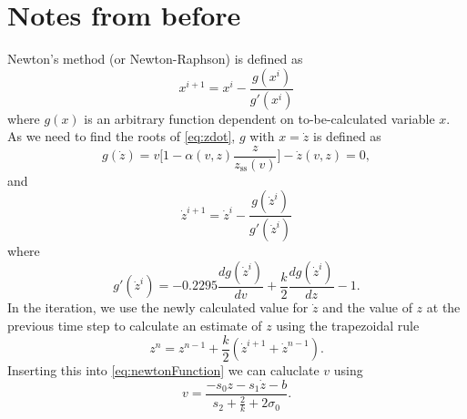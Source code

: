 \documentclass{article}
\begin{document}
\section{Notes from before}
Newton's method (or Newton-Raphson) is defined as
\begin{equation}
    x^{i+1} = x^{i} - \frac{g(x^i)}{g'(x^i)}
\end{equation}
where $g(x)$ is an arbitrary function dependent on to-be-calculated variable $x$.
As we need to find the roots of \eqref{eq:zdot}, $g$ with $x=\dot z$ is defined as
\begin{equation}
   g(\dot z) = v\bigg[1-\alpha(v, z)\frac{z}{z_\text{ss}(v)}\bigg] -  \dot z(v,z) = 0,
\end{equation}
and
\begin{equation}
    \dot z^{i+1} = \dot z^i - \frac{g(\dot z^i)}{g'(\dot z^i)}
\end{equation}
where
\begin{equation}
    g'(\dot z^i) = -0.2295\frac{dg(\dot z^i)}{dv} + \frac{k}{2}\frac{dg(\dot z^i)}{dz} - 1.
\end{equation}
In the iteration, we use the newly calculated value for $\dot z$ and the value of $z$ at the previous time step to calculate an estimate of $z$ using the trapezoidal rule
\begin{equation}
    z^n = z^{n-1} + \frac{k}{2}(\dot z^{i+1} + \dot z^{n-1}).
\end{equation}
Inserting this into \eqref{eq:newtonFunction} we can caluclate $v$ using
\begin{equation}
    v = \frac{-s_0z-s_1\dot z-b}{s_2 + \frac{2}{k} + 2\sigma_0}.
\end{equation}
\end{document}
